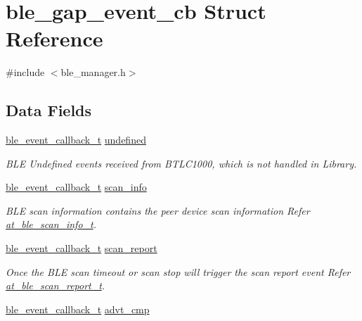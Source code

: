 \hypertarget{structble__gap__event__cb}{}\section{ble\+\_\+gap\+\_\+event\+\_\+cb Struct Reference}
\label{structble__gap__event__cb}


{\ttfamily \#include $<$ble\+\_\+manager.\+h$>$}

\subsection*{Data Fields}
\begin{DoxyCompactItemize}
\item 
\mbox{\hyperlink{ble__manager_8h_a04ce4bb8cb8282f2762e3924b1773cc9}{ble\+\_\+event\+\_\+callback\+\_\+t}} \mbox{\hyperlink{structble__gap__event__cb_a7d48511f1be9edaa2c90203676a4783d}{undefined}}
\begin{DoxyCompactList}\small\item\em B\+LE Undefined events received from B\+T\+L\+C1000, which is not handled in Library. \end{DoxyCompactList}\item 
\mbox{\hyperlink{ble__manager_8h_a04ce4bb8cb8282f2762e3924b1773cc9}{ble\+\_\+event\+\_\+callback\+\_\+t}} \mbox{\hyperlink{structble__gap__event__cb_a329baf6bb5a032ec1cbc23129c8fdc34}{scan\+\_\+info}}
\begin{DoxyCompactList}\small\item\em B\+LE scan information contains the peer device scan information Refer \mbox{\hyperlink{structat__ble__scan__info__t}{at\+\_\+ble\+\_\+scan\+\_\+info\+\_\+t}}. \end{DoxyCompactList}\item 
\mbox{\hyperlink{ble__manager_8h_a04ce4bb8cb8282f2762e3924b1773cc9}{ble\+\_\+event\+\_\+callback\+\_\+t}} \mbox{\hyperlink{structble__gap__event__cb_a3ee0fc48015b52eadf114dc0230dfe24}{scan\+\_\+report}}
\begin{DoxyCompactList}\small\item\em Once the B\+LE scan timeout or scan stop will trigger the scan report event Refer \mbox{\hyperlink{structat__ble__scan__report__t}{at\+\_\+ble\+\_\+scan\+\_\+report\+\_\+t}}. \end{DoxyCompactList}\item 
\mbox{\hyperlink{ble__manager_8h_a04ce4bb8cb8282f2762e3924b1773cc9}{ble\+\_\+event\+\_\+callback\+\_\+t}} \mbox{\hyperlink{structble__gap__event__cb_abe12b31fb97d5e0c3d9d5586cd6f4644}{advt\+\_\+cmp}}

\end{DoxyCompactItemize}
